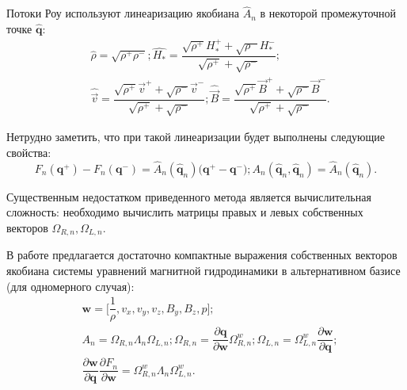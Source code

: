 \documentclass[14pt, a4paper, fleqn]{extreport}
\begin{document}
    Потоки Роу используют линеаризацию якобиана $\hat{A}_n$ в некоторой промежуточной точке $\hat{\textbf{q}}$:
    \begin{equation*}
    \begin{split}
        &\hat{\rho} = \sqrt{\rho^{+}\rho^{-}};
         \hat{H_*} = \dfrac{\sqrt{\rho^{+}}H_*^{+} + 
                            \sqrt{\rho^{-}}H_*^{-}}{\sqrt{\rho^{+}} + \sqrt{\rho^{-}}}; \\
        &\hat{\vec{v}} = \dfrac{\sqrt{\rho^{+}}\vec{v}^{+} + 
                                \sqrt{\rho^{-}}\vec{v}^{-}}{\sqrt{\rho^{+}} + \sqrt{\rho^{-}}};
         \hat{\vec{B}} = \dfrac{\sqrt{\rho^{+}}\vec{B}^{+} + 
                                \sqrt{\rho^{-}}\vec{B}^{-}}{\sqrt{\rho^{+}} + \sqrt{\rho^{-}}}.
    \end{split}
    \end{equation*}
    
    Нетрудно заметить, что при такой линеаризации будет выполнены следующие свойства:
    \begin{equation*}
        F_n(\textbf{q}^{+}) - F_n(\textbf{q}^{-}) 
            = \hat{A}_n(\hat{\textbf{q}}_n)\Big( \textbf{q}^{+}-\textbf{q}^{-} \Big);
        A_n(\hat{\textbf{q}}_n,\hat{\textbf{q}}_n) = \hat{A}_n(\hat{\textbf{q}}_n).
    \end{equation*}

    Существенным недостатком приведенного метода является вычислительная сложность:
    необходимо вычислить матрицы правых и левых собственных векторов $\Omega_{R,n}, \Omega_{L,n}$.
    
    В работе \cite{ZACHARY1992341}
    предлагается достаточно компактные выражения собственных векторов
    якобиана системы уравнений магнитной гидродинамики
    в альтернативном базисе (для одномерного случая):
    \begin{equation*}
    \begin{split}
        &\textbf{w} = \Big[ \dfrac{1}{\rho}, v_x, v_y, v_z, B_y, B_z, p \Big]; \\
        &A_n 
            = \Omega_{R,n}\Lambda_{n}\Omega_{L,n}; 
              \Omega_{R,n} = \dfrac{\partial\textbf{q}}{\partial\textbf{w}} \Omega_{R,n}^w;
              \Omega_{L,n} = \Omega_{L,n}^w \dfrac{\partial\textbf{w}}{\partial\textbf{q}}; \\
        &\dfrac{\partial\textbf{w}}{\partial\textbf{q}} \dfrac{\partial F_n}{\partial \textbf{w}}
            = \Omega_{R,n}^w\Lambda_{n}\Omega_{L,n}^w.
    \end{split}
    \end{equation*}
    
\end{document}
